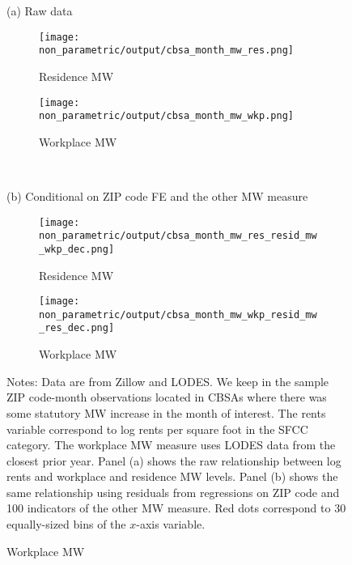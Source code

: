\begin{figure}[h!]
    \centering
    \caption{Relationship between log rents and the minimum wage measures, 
             sample of affected ZIP code-months}
    \label{fig:rents_mw_non_parametric}
    
    \begin{minipage}{.95\textwidth} \centering
        (a) Raw data
        \vspace{1mm}
    \end{minipage}
    \begin{subfigure}{0.49\textwidth}
        \caption*{Residence MW}
        \texttt{[image: non\_parametric/output/cbsa\_month\_mw\_res.png]}
    \end{subfigure}%
    \begin{subfigure}{0.49\textwidth}
        \caption*{Workplace MW}
        \texttt{[image: non\_parametric/output/cbsa\_month\_mw\_wkp.png]}
    \end{subfigure}\\

    \vspace{2mm}
    \begin{minipage}{.95\textwidth} \centering
        (b) Conditional on ZIP code FE and the other MW measure
        \vspace{1mm}
    \end{minipage}
    \begin{subfigure}{0.49\textwidth}
        \caption*{Residence MW}
        \texttt{[image: non\_parametric/output/cbsa\_month\_mw\_res\_resid\_mw\_wkp\_dec.png]}
    \end{subfigure}%
    \begin{subfigure}{0.49\textwidth}
        \caption*{Workplace MW}
        \texttt{[image: non\_parametric/output/cbsa\_month\_mw\_wkp\_resid\_mw\_res\_dec.png]}
    \end{subfigure}

    \begin{minipage}{.95\textwidth} \footnotesize
        \vspace{3mm}
        Notes:
        Data are from Zillow and LODES.
        We keep in the sample ZIP code-month observations located in CBSAs where 
        there was some statutory MW increase in the month of interest. 
        The rents variable correspond to log rents per square foot in the SFCC 
        category.
        The workplace MW measure uses LODES data from the closest prior year.
        Panel (a) shows the raw relationship between log rents and workplace 
        and residence MW levels.
        Panel (b) shows the same relationship using residuals from regressions 
        on ZIP code and 100 indicators of the other MW measure.
        Red dots correspond to 30 equally-sized bins of the $x$-axis variable.
    \end{minipage}
\end{figure}